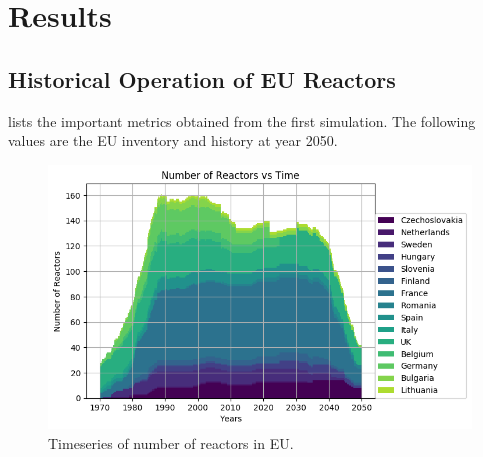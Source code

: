 \section{Results}


\subsection{Historical Operation of \gls{EU} Reactors}


\begin{table}[h]
	\centering
		\caption{Simulation Results}
		\label{tab:sim_result}
		\end {table}

 lists the important metrics
obtained from the first simulation. The following
values are the \gls{EU} inventory and history at year 2050.


\begin{figure}[htbp!]
	\begin{center}
		\includegraphics[width=\columnwidth]{./images/eu_future/number_plot.png}
	\end{center}
	\caption{Timeseries of number of reactors in \gls{EU}.}
	\label{fig:eu_num}
\end{figure}

